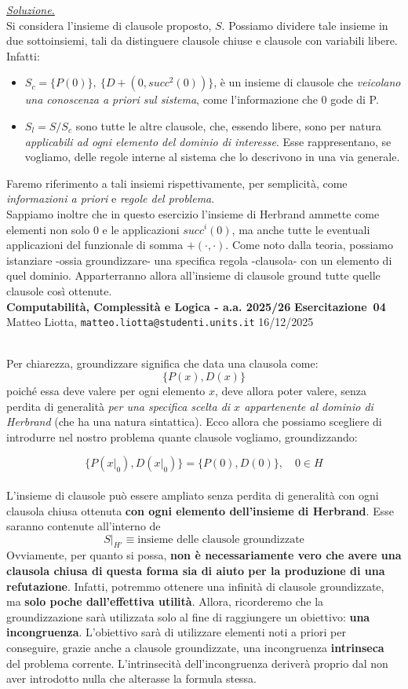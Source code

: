 \documentclass[a4paper,10pt]{article}
\makeatletter
\newcommand{\DocType}{Esercitazione} %
\newcommand{\FullTitle}{\DocType\ \EsercitazioneNum}
\newcommand{\Header}{
\noindent
  \small \textbf{Computabilità, Complessità e Logica - a.a. 2025/26} \hfill \textbf{\FullTitle} \\[0.2cm]
  \scriptsize Matteo Liotta, \texttt{matteo.liotta@studenti.units.it} \hfill \Data \\[0.2cm]
  \noindent\makebox[\linewidth]{\rule{\linewidth}{0.4pt}} \\[0.3cm]}
\newcommand{\NewPageHeader}{
  \vfill
  \noindent\makebox[\linewidth]{\rule{\linewidth}{0.4pt}}
  \newpage
  {\Header}
}
\newcommand{\EsercitazioneNum}{04}
\newcommand{\Data}{16/12/2025}
\makeatother
\begin{document}
\underline{\textit{Soluzione.}}\\
Si considera l'insieme di clausole proposto, $S$. Possiamo dividere tale insieme in due sottoinsiemi, tali da distinguere clausole chiuse e clausole con variabili libere. Infatti:
\begin{itemize}
    \item $S_c = \{P(0)\}, \ \{D+(0,succ^2(0))\}$, è un insieme di clausole che \textit{veicolano una conoscenza a priori sul sistema}, come l'informazione che $0$ gode di P.
    \item $S_l=S/S_c$ sono tutte le altre clausole, che, essendo libere, sono per natura \textit{applicabili ad ogni elemento del dominio di interesse}. Esse rappresentano, se vogliamo, delle regole interne al sistema che lo descrivono in una via generale.
\end{itemize}

Faremo riferimento a tali insiemi rispettivamente, per semplicità, come \textit{informazioni a priori} e \textit{regole del problema}. \\ Sappiamo inoltre che in questo esercizio l'insieme di Herbrand ammette come elementi non solo $0$ e le applicazioni $succ^i(0)$, ma anche tutte le eventuali applicazioni del funzionale di somma $+(\cdot,\cdot)$. Come noto dalla teoria, possiamo istanziare -ossia groundizzare- una specifica regola -clausola- con un elemento di quel dominio. Apparterranno allora all'insieme di clausole ground tutte quelle clausole così ottenute.\\

\NewPageHeader
Per chiarezza, groundizzare significa che data una clausola come:
$$\{P(x),D(x)\}$$ 
poiché essa deve valere per ogni elemento $x$, deve allora poter valere, senza perdita di generalità \textit{per una specifica scelta di $x$ appartenente al dominio di Herbrand} (che ha una natura sintattica).
Ecco allora che possiamo scegliere di introdurre nel nostro problema quante clausole vogliamo, groundizzando:

$$\{P(x|_0),D(x|_0)\} = \{P(0),D(0)\},\quad 0\in H$$\\
L'insieme di clausole può essere ampliato senza perdita di generalità con ogni clausola chiusa ottenuta \textbf{con ogni elemento dell'insieme di Herbrand}. Esse saranno contenute all'interno de
$$S|_{H'}\equiv\text{insieme delle clausole groundizzate}$$
Ovviamente, per quanto si possa, \textbf{non è necessariamente vero che avere una clausola chiusa di questa forma sia di aiuto per la produzione di una refutazione}. Infatti, potremmo ottenere una infinità di clausole groundizzate, ma \textbf{solo poche dall'effettiva utilità}. Allora, ricorderemo che la groundizzazione sarà utilizzata solo al fine di raggiungere un obiettivo: \textbf{una incongruenza}. L'obiettivo sarà di utilizzare elementi noti a priori per conseguire, grazie anche a clausole groundizzate, una incongruenza \textbf{intrinseca} del problema corrente. L'intrinsecità dell'incongruenza deriverà proprio dal non aver introdotto nulla che alterasse la formula stessa.\\
\end{document}
